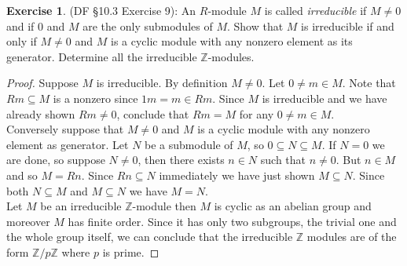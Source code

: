 \documentclass[8pt]{amsart}
\theoremstyle{plain}%
\theoremstyle{definition}
\newtheorem*{exercise}{Exercise}%
\theoremstyle{remark}
\numberwithin{equation}{section}
\newcommand{\Z}{\mathbb{Z}}
\begin{document}
\begin{exercise}
(DF \S 10.3 Exercise 9): An $R$-module $M$ is called \textit{irreducible} if $M \neq 0$ and if $0$ and $M$ are the only submodules of $M$. Show that $M$ is irreducible if and only if $M \neq 0$ and $M$ is a cyclic module with any nonzero element as its generator. Determine all the irreducible $\Z$-modules.
	\begin{proof}
		Suppose $M$ is irreducible. By definition $M \neq 0$. Let $0 \neq m \in M$. Note that $Rm \subseteq M$ is a nonzero since $1m = m \in Rm$. Since $M$ is irreducible and we have already shown $Rm \neq 0$, conclude that $Rm = M$ for any $0 \neq m \in M$.\\

		Conversely suppose that $M \neq 0$ and $M$ is a cyclic module with any nonzero element as generator. Let $N$ be a submodule of $M$, so $0 \subseteq N \subseteq M$. If $N = 0$ we are done, so suppose $N \neq 0$, then there exists $n \in N$ such that $n \neq 0$. But $n \in M$ and so $M = Rn$. Since $Rn \subseteq N$ immediately we have just shown $M \subseteq N$. Since both $N \subseteq M$ and $M \subseteq N$ we have $M = N$.\\

		Let $M$ be an irreducible $\Z$-module then $M$ is cyclic as an abelian group and moreover $M$ has finite order. Since it has only two subgroups, the trivial one and the whole group itself, we can conclude that the irreducible $\Z$ modules are of the form $\Z/p\Z$ where $p$ is prime.
	\end{proof}
\end{exercise}
\end{document}

